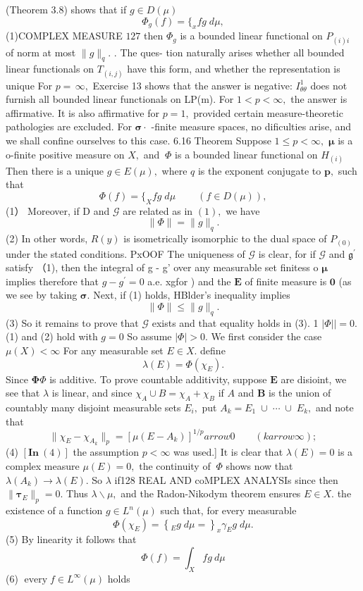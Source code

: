 (Theorem 3.8) shows that if $g\in D(\mu)$ $$ \Phi_{g}(f)= \{_{x}^{}f g\;d\mu, $$ (1)COMPLEX MEASURE $127$ then $\Phi_{g}$ is a bounded linear functional on $P_{(i)i}$ of norm at most $\|g\|_{q}.$ . The ques- tion naturally arises whether all bounded linear functionals on $\scriptstyle T_{(i,j)}$ have this form, and whether the representation is unique For $p=\,\infty,$ Exercise 13 shows that the answer is negative: $\scriptstyle I_{\theta\theta}^{1}$ does not furnish all bounded linear functionals on LP(m). For $1<p<\infty,$ the answer is affirmative. It is also affirmative for $\scriptstyle p=1,$ provided certain measure-theoretic pathologies are excluded. For ${\boldsymbol{\sigma}}\cdot$ -finite measure spaces, no dificulties arise, and we shall confine ourselves to this case. 6.16 Theorem Suppose $1\leq p<\infty,$ ${\boldsymbol{\mu}}$ is a o-finite positive measure on $X,$ and $\ \Phi$ is a bounded linear functional on $\scriptstyle{H_{(i)}}$ Then there is a unique $g\in E(\mu),$ where $\boldsymbol{\mathit{q}}$ is the exponent conjugate to ${\boldsymbol{p}},$ such that $$ \Phi(f)= \{_{X}^{}f g\;d\mu\ {\qquad(f\in D(\mu)),} $$ (1） Moreover, if D and $\scriptstyle{\mathcal{G}}$ are related as in $(1),$ we have $$ \|\Phi\|=\|g\|_{q}. $$ (2) In other words, $\scriptstyle R(y)$ is isometrically isomorphic to the dual space of $\scriptstyle P_{(0)}$ under the stated conditions. PxOOF The uniqueness of $\scriptstyle{\mathcal{G}}$ is clear, for if $\scriptstyle{\mathcal{G}}$ and ${\mathfrak{g}}^{\prime}$ satisfy （1), then the integral of g - g' over any measurable set finitess o ${\boldsymbol{\mu}}$ implies therefore that $g-g^{\prime}=0$ a.e. xgfor ) and the $\boldsymbol{E}$ of finite measure is $\mathbf{0}$ (as we see by taking ${\boldsymbol{\sigma}}.$ Next, if (1) holds, HBlder's inequality implies $$ \|\Phi\|\leq\|g\|_{q}. $$ (3) So it remains to prove that $\scriptstyle{\mathcal{G}}$ exists and that equality holds in (3). 1 $|\Phi||=0.$ (1) and (2) hold with $\scriptstyle g=0$ So assume $|\Phi|>0.$ We first consider the case $\mu(X)<\infty$ For any measurable set $E\in X.$ define $$ \lambda(E)=\Phi(\chi_{E}). $$ Since $\mathbf{\Phi}\Phi$ is additive. To prove countable additivity, suppose $\boldsymbol{E}$ are disioint, we see that $\lambda$ is linear, and since $\chi_{A}\cup B=\chi_{A}+\chi_{B}$ if $\scriptstyle A$ and $\boldsymbol{B}$ is the union of countably many disjoint measurable sets $E_{i},$ put $A_{k}=E_{1}\;\cup\;\cdots\;\cup\;E_{k},$ and note that $$ \|\chi_{E}-\chi_{A_{k}}\|_{p}=[\mu(E-A_{k})]^{1/p} arrow0\qquad(k arrow\infty); $$ (4) $\left[\mathbf{In}~(4)\right]$ the assumption $p<\infty$ was used.] ${\mathrm{It}}$ is clear that $\lambda(E)=0$ is a complex measure $\mu(E)=0,$ the continuity of $\ \Phi$ shows now that $\lambda(A_{k})\to\lambda(E).$ So $\lambda$ if128 REAL AND coMPLEX ANALYSIs since then $\|{\boldsymbol{\tau}}_{E}\|_{p}=0.$ Thus $\scriptstyle\lambda\smallsetminus\mu,$ and the Radon-Nikodym theorem ensures $E\in X.$ the existence of a function $g\in L^{n}(\mu)$ such that, for every measurable $$ \Phi(\chi_{E})=\left\{_{E}^{}g\;d\mu=\right\}_{x}^{}\gamma_{E}g\;d\mu. $$ (5) By linearity it follows that $$ \Phi(f)=\int_{X}f g\ d\mu $$ (6) $\operatorname{every}f\in L^{\infty}(\mu)$ holds 